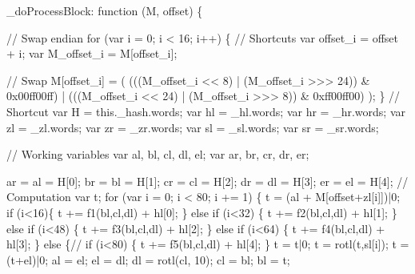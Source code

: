 \begin{DoxyCodeInclude}
        \_doProcessBlock: \textcolor{keyword}{function} (M, offset) \{

            \textcolor{comment}{// Swap endian}
            \textcolor{keywordflow}{for} (var i = 0; i < 16; i++) \{
                \textcolor{comment}{// Shortcuts}
                var offset\_i = offset + i;
                var M\_offset\_i = M[offset\_i];

                \textcolor{comment}{// Swap}
                M[offset\_i] = (
                    (((M\_offset\_i << 8)  | (M\_offset\_i >>> 24)) & 0x00ff00ff) |
                    (((M\_offset\_i << 24) | (M\_offset\_i >>> 8))  & 0xff00ff00)
                );
            \}
            \textcolor{comment}{// Shortcut}
            var H  = this.\_hash.words;
            var hl = \_hl.words;
            var hr = \_hr.words;
            var zl = \_zl.words;
            var zr = \_zr.words;
            var sl = \_sl.words;
            var sr = \_sr.words;

            \textcolor{comment}{// Working variables}
            var al, bl, cl, dl, el;
            var ar, br, cr, dr, er;

            ar = al = H[0];
            br = bl = H[1];
            cr = cl = H[2];
            dr = dl = H[3];
            er = el = H[4];
            \textcolor{comment}{// Computation}
            var t;
            \textcolor{keywordflow}{for} (var i = 0; i < 80; i += 1) \{
                t = (al +  M[offset+zl[i]])|0;
                \textcolor{keywordflow}{if} (i<16)\{
                t +=  f1(bl,cl,dl) + hl[0];
                \} \textcolor{keywordflow}{else} \textcolor{keywordflow}{if} (i<32) \{
                t +=  f2(bl,cl,dl) + hl[1];
                \} \textcolor{keywordflow}{else} \textcolor{keywordflow}{if} (i<48) \{
                t +=  f3(bl,cl,dl) + hl[2];
                \} \textcolor{keywordflow}{else} \textcolor{keywordflow}{if} (i<64) \{
                t +=  f4(bl,cl,dl) + hl[3];
                \} \textcolor{keywordflow}{else} \{\textcolor{comment}{// if (i<80) \{}
                t +=  f5(bl,cl,dl) + hl[4];
                \}
                t = t|0;
                t =  rotl(t,sl[i]);
                t = (t+el)|0;
                al = el;
                el = dl;
                dl = rotl(cl, 10);
                cl = bl;
                bl = t;


\end{DoxyCodeInclude}
